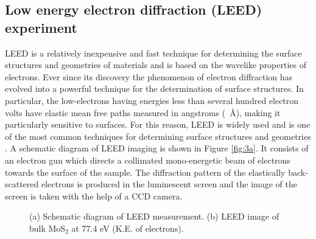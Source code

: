 \documentclass[12pt]{article}
\begin{document}
\subsection{Low energy electron diffraction (LEED) experiment}
LEED is a relatively inexpensive and fast technique for determining the surface structures and geometries of materials and is based on the wavelike properties of electrons. Ever since its discovery the phenomenon of electron diffraction has evolved into a powerful technique for the determination of surface structures. In particular, the low-electrons having energies less than several hundred electron volts have elastic mean free paths measured in angstroms (\SI{}{\angstrom}), making it particularly sensitive to surfaces. For this reason, LEED is widely used and is one of the most common techniques for determining surface structures and geometries \cite{watson2003nist,van2009atomic,soares2011advances}. A schematic diagram of LEED imaging is shown in Figure \ref{fig:3a}. It consists of an electron gun which directs a collimated mono-energetic beam of electrons towards the surface of the sample. The diffraction pattern of the elastically back-scattered electrons is produced in the luminescent screen and the image of the screen is taken with the help of a CCD camera.


\begin{figure}[H]
\centering
{}\quad \hspace{45pt}
\caption{(a) Schematic diagram of LEED measurement. (b) LEED image of bulk MoS$_2$ at 77.4 eV (K.E. of electrons).}
\end{figure}
\end{document}
